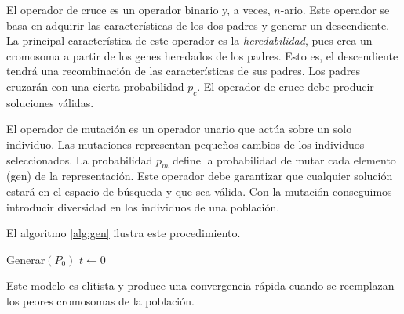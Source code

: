 El operador de cruce es un operador binario y, a veces, $n$-ario. Este operador se basa en adquirir las características de los dos padres y generar un descendiente. La principal característica de este operador es la \emph{heredabilidad}, pues crea un cromosoma a partir de los genes heredados de los padres. Esto es, el descendiente tendrá una recombinación de las características de sus padres. Los padres cruzarán con una cierta probabilidad $p_c$. El operador de cruce debe producir soluciones válidas.

El operador de mutación es un operador unario que actúa sobre un solo individuo. Las mutaciones representan pequeños cambios de los individuos seleccionados. La probabilidad $p_m$ define la probabilidad de mutar cada elemento (gen) de la representación. Este operador debe garantizar que cualquier solución estará en el espacio de búsqueda y que sea válida. Con la mutación conseguimos introducir diversidad en los individuos de una población.

El algoritmo \ref{alg:gen} ilustra este procedimiento.

\begin{Ualgorithm}[H]
    \label{alg:gen}
    \small
    \DontPrintSemicolon
    Generar$(P_0)$ 
    $t \longleftarrow 0$\;
\end{Ualgorithm}

Este modelo es elitista y produce una convergencia rápida cuando se reemplazan los peores cromosomas de la población.

